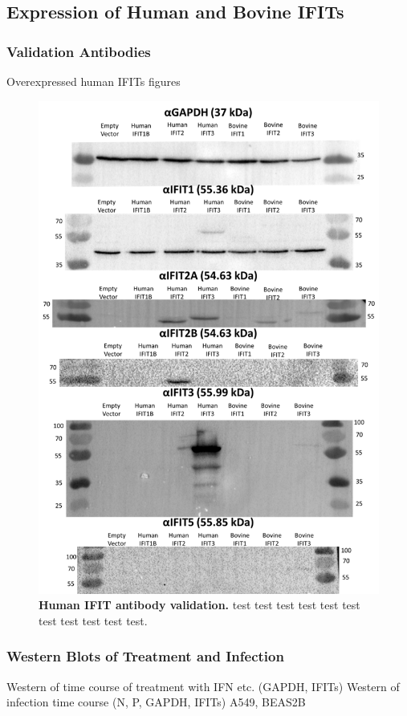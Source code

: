 \subsection{Expression of Human and Bovine IFITs} \label{Expression of Human and Bovine IFITs}
\subsubsection{Validation Antibodies} \label{Validation Antibodies}
Overexpressed human IFITs \newline
figures

\begin{figure}
    \centering
    \includegraphics[width=0.5\linewidth]{06. Chapter 1/Figs/02. Expression/01. atb-validation.png}
    \caption[Human IFIT antibody validation.]{\textbf{Human IFIT antibody validation.} test test test test test test test test test test test.}
    \label{Human IFIT antibody validation.} 
\end{figure}

\subsubsection{Western Blots of Treatment and Infection} \label{Western Blots of Treatment and Infection}
Western of time course of treatment with IFN etc. (GAPDH, IFITs) \newline
Western of infection time course (N, P, GAPDH, IFITs) \newline
A549, BEAS2B

